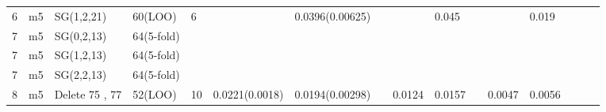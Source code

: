 \documentclass[a4paper,12pt,titlepage]{article} %
\numberwithin{equation}{section}  %
\begin{document}
\begin{landscape}
\begin{table}[]
\begin{tabular}{llllllllllllllll}
		6 & m5 & SG(1,2,21) & 60(LOO) & 6 &  & 0.0396(0.00625) &  &  & 0.045 &  &  & 0.019 &  &  &  \\
		7 & m5 & SG(0,2,13) & 64(5-fold) &  &  &  &  &  &  &  &  &  &  &  &  \\
		7 & m5 & SG(1,2,13) & 64(5-fold) &  &  &  &  &  &  &  &  &  &  &  &  \\
		7 & m5 & SG(2,2,13) & 64(5-fold) &  &  &  &  &  &  &  &  &  &  &  &  \\
		8 & m5 & Delete 75 , 77 & 52(LOO) & 10 & 0.0221(0.0018) & 0.0194(0.00298) &  & 0.0124 & 0.0157 &  & 0.0047 & 0.0056 &  &  & 
	\end{tabular}
\end{table}



    \end{landscape}
\end{document}
